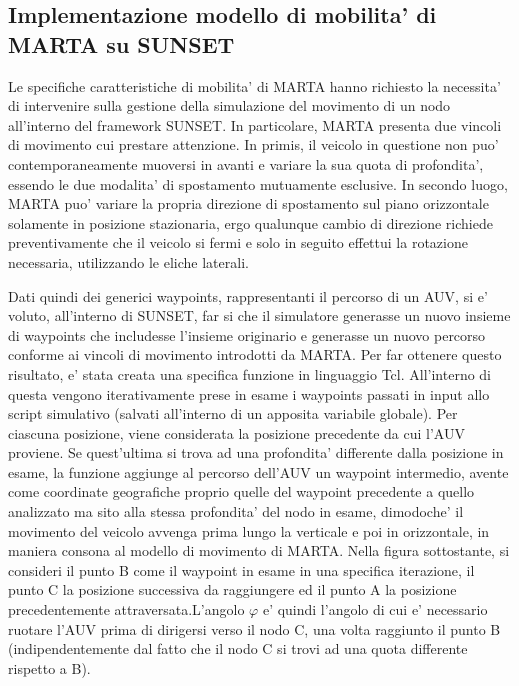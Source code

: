 \subsection{Implementazione modello di mobilita' di MARTA su SUNSET}
Le specifiche caratteristiche di mobilita' di MARTA hanno richiesto la necessita' di intervenire sulla gestione della simulazione del movimento di un nodo all'interno del framework SUNSET. \newline In particolare, MARTA presenta due vincoli di movimento cui prestare attenzione. In primis, il veicolo in questione non puo' contemporaneamente muoversi in avanti e variare la sua quota di profondita', essendo le due modalita' di spostamento mutuamente esclusive. In secondo luogo, MARTA puo' variare la propria direzione di spostamento sul piano orizzontale solamente in posizione stazionaria, ergo qualunque cambio di direzione richiede preventivamente che il veicolo si fermi e solo in seguito effettui la rotazione necessaria, utilizzando le eliche laterali.\par
Dati quindi dei generici waypoints, rappresentanti il percorso di un AUV, si e' voluto, all'interno di SUNSET, far si che il simulatore generasse un nuovo insieme di waypoints che includesse l'insieme originario e generasse un nuovo percorso conforme ai vincoli di movimento introdotti da MARTA. \newline Per far ottenere questo risultato, e' stata creata una specifica funzione in linguaggio Tcl.  All'interno di questa vengono iterativamente prese in esame i waypoints passati in input allo script simulativo (salvati all'interno di un apposita variabile globale). Per ciascuna posizione, viene considerata la posizione precedente da cui l'AUV proviene. Se quest'ultima si trova ad una profondita' differente dalla posizione in esame, la funzione aggiunge al percorso dell'AUV un waypoint intermedio, avente come coordinate geografiche proprio quelle del waypoint precedente a quello analizzato ma sito alla stessa profondita' del nodo in esame, dimodoche' il movimento del veicolo avvenga prima lungo la verticale e poi in orizzontale, in maniera consona al modello di movimento di MARTA.\newline
Nella figura sottostante, si consideri il punto B come il waypoint in esame in una specifica iterazione, il punto C la posizione successiva da raggiungere ed il punto A la posizione precedentemente attraversata.\newline L'angolo $\varphi$  e' quindi l'angolo di cui e' necessario ruotare l'AUV prima di dirigersi verso il nodo C, una volta raggiunto il punto B (indipendentemente dal fatto che il nodo C si trovi ad una quota differente rispetto a B). 

